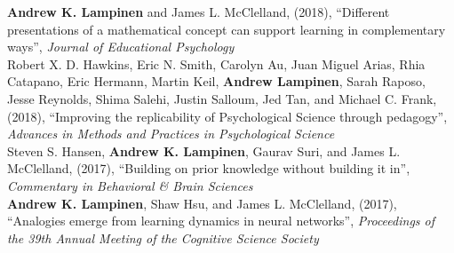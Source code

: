 \documentclass[margin]{res}
\begin{document}
\begin{resume}
{\textbf{Andrew K. Lampinen} and James L. McClelland, (2018), {``Different presentations of a mathematical concept can support learning in complementary ways'',} \textit{Journal of Educational Psychology} \\[3pt]
 Robert X. D. Hawkins, Eric N. Smith, Carolyn Au, Juan Miguel Arias, Rhia Catapano, Eric Hermann, Martin Keil, \textbf{Andrew Lampinen}, Sarah Raposo, Jesse Reynolds, Shima Salehi, Justin Salloum, Jed Tan, and Michael C. Frank, (2018), {``Improving the replicability of Psychological Science through pedagogy'',}  \textit{Advances in Methods and Practices in Psychological Science} \\ [3pt]
Steven S. Hansen, \textbf{Andrew K. Lampinen}, Gaurav Suri, and James L. McClelland, (2017), {``Building on prior knowledge without building it in'',} \textit{Commentary in Behavioral \& Brain Sciences}  \\[3pt]
\textbf{Andrew K. Lampinen}, Shaw Hsu, and James L. McClelland, (2017), {``Analogies emerge from learning dynamics in neural networks'',} \textit{Proceedings of the 39th Annual Meeting of the Cognitive Science Society}  

}
\end{resume}
\end{document}
